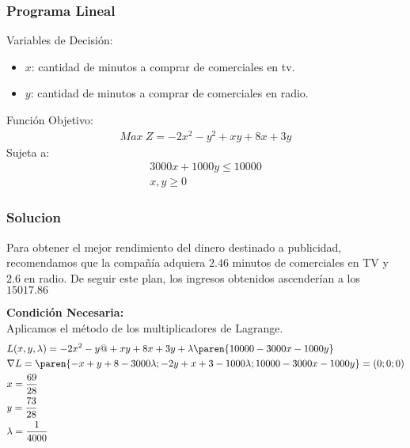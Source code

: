 \begin{homeworkProblem}[-1][Publicidad]

\subsubsection{Programa Lineal}
Variables de Decisión:
\begin{itemize}
    \item $x$: cantidad de minutos a comprar de comerciales en tv.
    \item $y$: cantidad de minutos a comprar de comerciales en radio.
\end{itemize}
Función Objetivo:
\begin{align*}
    Max\ Z = -2x^2-y^2+xy+8x+3y
\end{align*}
Sujeta a:
\begin{align*}
    3000x+1000y\leq 10000 \\ x,y\geq0
\end{align*}
\subsubsection{Solucion}
Para obtener el mejor rendimiento del dinero destinado a publicidad, recomendamos que la compañía adquiera $2.46$ minutos de comerciales en TV y $2.6$ en radio. De seguir este plan, los ingresos obtenidos ascenderían a los $15017.86$

\textbf{Condición Necesaria:}\\
Aplicamos el método de los multiplicadores de Lagrange.
\begin{align*}
    &L(x,y,\lambda)=-2x^2-y@+xy+8x+3y+\lambda\paren{10000-3000x-1000y}\\
    &\nabla L = \paren{-x+y+8-3000\lambda;-2y+x+3-1000\lambda ;10000 - 3000x-1000y} = (0;0;0)\\
    &x = \frac{69}{28} \\
    &y = \frac{73}{28} \\
    &\lambda = \frac{1}{4000}
\end{align*}



\end{homeworkProblem}
